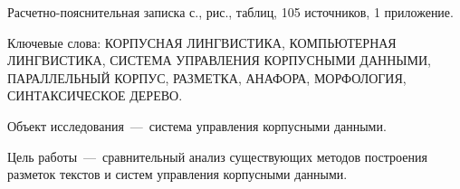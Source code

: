 
Расчетно-пояснительная записка \pageref{LastPage} с., \totalfigures{} рис., \totaltables{} таблиц, 105 источников, 1 приложение.

Ключевые слова: КОРПУСНАЯ ЛИНГВИСТИКА, КОМПЬЮТЕРНАЯ ЛИНГВИСТИКА, СИСТЕМА УПРАВЛЕНИЯ КОРПУСНЫМИ ДАННЫМИ, ПАРАЛЛЕЛЬНЫЙ КОРПУС,	 РАЗМЕТКА, АНАФОРА, МОРФОЛОГИЯ, СИНТАКСИЧЕСКОЕ ДЕРЕВО.

Объект исследования~---~система управления корпусными данными.

Цель работы~---~сравнительный анализ существующих методов построения разметок текстов и систем управления корпусными данными.